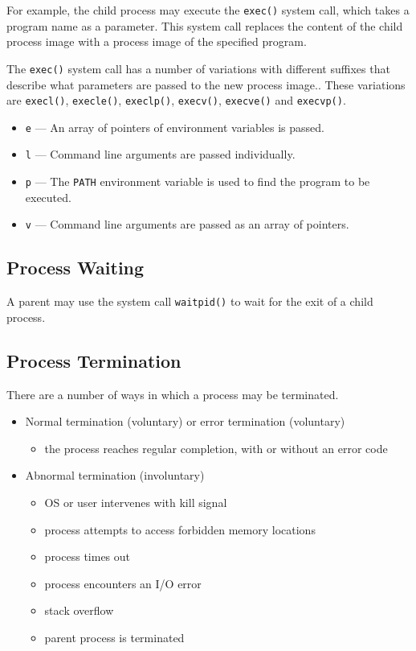 For example, the child process may execute the \texttt{exec()} system call, which takes a program name as a parameter.
This system call replaces the content of the child process image with a process image of the specified program.

The \texttt{exec()} system call has a number of variations with different suffixes that describe what parameters are passed to the new process image..
These variations are \texttt{execl()}, \texttt{execle()}, \texttt{execlp()}, \texttt{execv()}, \texttt{execve()} and \texttt{execvp()}.

\begin{itemize}
  \item \texttt{e} --- An array of pointers of environment variables is passed.
  \item \texttt{l} --- Command line arguments are passed individually.
  \item \texttt{p} --- The \texttt{PATH} environment variable is used to find the program to be executed.
  \item \texttt{v} --- Command line arguments are passed as an array of pointers.
\end{itemize}

\subsection{Process Waiting}

A parent may use the system call \texttt{waitpid()} to wait for the exit of a child process.

\subsection{Process Termination}

There are a number of ways in which a process may be terminated.
\begin{itemize}
  \item Normal termination (voluntary) or error termination (voluntary)
  \begin{itemize}
    \item the process reaches regular completion, with or without an error code
  \end{itemize}
  \item Abnormal termination (involuntary)
  \begin{itemize}
    \item OS or user intervenes with kill signal
    \item process attempts to access forbidden memory locations
    \item process times out
    \item process encounters an I/O error
    \item stack overflow
    \item parent process is terminated
  \end{itemize}
\end{itemize}

